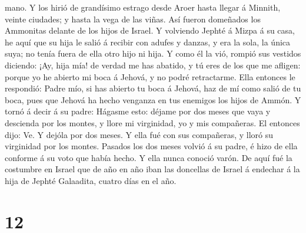 mano.  Y los hirió de grandísimo estrago desde Aroer
hasta llegar á Minnith, veinte ciudades; y hasta la vega de las viñas.
Así fueron domeñados los Ammonitas delante de los hijos de Israel.
 Y volviendo Jephté á Mizpa á su casa, he aquí que su
hija le salió á recibir con adufes y danzas, y era la sola, la única
suya; no tenía fuera de ella otro hijo ni hija.  Y como
él la vió, rompió sus vestidos diciendo: ¡Ay, hija mía! de verdad me has
abatido, y tú eres de los que me afligen: porque yo he abierto mi boca á
Jehová, y no podré retractarme.  Ella entonces le
respondió: Padre mío, si has abierto tu boca á Jehová, haz de mí como
salió de tu boca, pues que Jehová ha hecho venganza en tus enemigos los
hijos de Ammón.  Y tornó á decir á su padre: Hágasme
esto: déjame por dos meses que vaya y descienda por los montes, y llore
mi virginidad, yo y mis compañeras.  El entonces dijo:
Ve. Y dejóla por dos meses. Y ella fué con sus compañeras, y lloró su
virginidad por los montes.  Pasados los dos meses volvió
á su padre, é hizo de ella conforme á su voto que había hecho. Y ella
nunca conoció varón.  De aquí fué la costumbre en Israel
que de año en año iban las doncellas de Israel á endechar á la hija de
Jephté Galaadita, cuatro días en el año.

\hypertarget{section-11}{%
\section{12}\label{section-11}}

